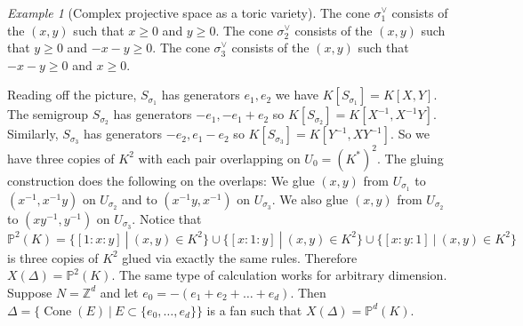 \documentclass[BSc]{usydthesis}
\numberwithin{equation}{chapter}
\theoremstyle{remark}
\newtheorem{Example}[equation]{Example}
\newcommand{\Z}{\mathbb{Z}}
\newcommand{\Proj}{\mathbb{P}}
\newcommand{\V}{\vee}
\DeclareMathOperator{\Cone}{Cone}
\begin{document}
\begin{Example}[Complex projective space as a toric variety]
The cone $\sigma_1^{\V}$ consists of the $(x,y)$ such that $x\geq 0$ and  $y\geq 0.$ The cone $\sigma_2^{\V}$ consists of the $(x,y)$ such that $y\geq 0$ and $-x-y\geq 0.$ The cone $\sigma_3^{\V}$ consists of the $(x,y)$ such that $-x-y\geq 0$ and $x\geq 0.$ 
    \begin{figure}[ht]
  \centering
  \label{figure:lattice7}
\end{figure}

Reading off the picture, $S_{\sigma_1}$ has generators $e_1, e_2$ we have $K[S_{\sigma_1}] = K[X,Y].$ The semigroup $S_{\sigma_2}$ has generators $-e_1, -e_1+e_2$ so $K[S_{\sigma_2}] = K[X^{-1} , X^{-1}Y].$ Similarly, $S_{\sigma_3}$ has generators $-e_2, e_1-e_2$ so $K[S_{\sigma_3}] = K[Y^{-1} , XY^{-1}].$ So we have three copies of $K^2$ with each pair overlapping on $U_{0} = (K^*)^2.$ The gluing construction does the following on the overlaps: We glue $(x,y)$ from $U_{\sigma_1}$ to $(x^{-1}, x^{-1}y)$ on $U_{\sigma_2}$ and to $(x^{-1}y, x^{-1})$ on $U_{\sigma_3}.$ We also glue $(x,y)$ from $U_{\sigma_2}$ to $(xy^{-1}, y^{-1})$ on $U_{\sigma_3}.$ Notice that $\Proj^2(K) = \{ [1:x:y] \ | \ (x,y) \in K^2 \}\cup \{ [x:1:y] \ | \ (x,y) \in K^2 \}\cup \{ [x:y:1] \ | \ (x,y) \in K^2 \}$ is three copies of $K^2$ glued via exactly the same rules. Therefore $X(\Delta) = \Proj^2(K).$ The same type of calculation works for arbitrary dimension. Suppose $N=\Z^d$ and let $e_0 = -(e_1+e_2+\ldots+e_d).$ Then $\Delta = \{ \Cone(E) \ | \ E\subset \{e_0, \ldots, e_d\} \}$ is a fan such that $X(\Delta) = \Proj^d(K).$
\end{Example}
\end{document}
